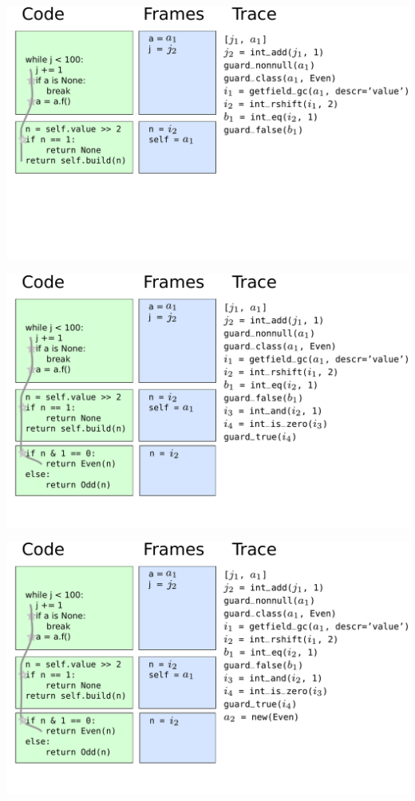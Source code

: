 \documentclass[utf8x]{beamer}
\begin{document}
\begin{frame}
  \includegraphics[scale=0.4]{figures/loop07}
\end{frame}

\begin{frame}
  \includegraphics[scale=0.4]{figures/loop08}
\end{frame}

\begin{frame}
  \includegraphics[scale=0.4]{figures/loop09}
\end{frame}
\end{document}
